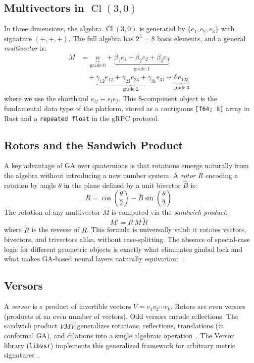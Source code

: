 \documentclass[conference]{IEEEtran}
\begin{document}
\subsection{Multivectors in \texorpdfstring{$\operatorname{Cl}(3,0)$}{Cl(3,0)}}
In three dimensions, the algebra $\operatorname{Cl}(3,0)$ is generated by $\{e_1, e_2, e_3\}$ with signature $(+,+,+)$. The full algebra has $2^3 = 8$ basis elements, and a general \textit{multivector} is:
\begin{equation}
\begin{aligned}
    M &= \underbrace{\alpha}_{\text{grade 0}} + \underbrace{\beta_1 e_1 + \beta_2 e_2 + \beta_3 e_3}_{\text{grade 1}} \\
      &\quad + \underbrace{\gamma_{12} e_{12} + \gamma_{23} e_{23} + \gamma_{31} e_{31}}_{\text{grade 2}} + \underbrace{\delta\, e_{123}}_{\text{grade 3}}
\end{aligned}
    \label{eq:multivector}
\end{equation}
where we use the shorthand $e_{ij} \equiv e_i e_j$. This 8-component object is the fundamental data type of the platform, stored as a contiguous \texttt{[f64; 8]} array in Rust and a \texttt{repeated float} in the gRPC protocol.

\subsection{Rotors and the Sandwich Product}
A key advantage of GA over quaternions is that rotations emerge naturally from the algebra without introducing a new number system. A \textit{rotor} $R$ encoding a rotation by angle $\theta$ in the plane defined by a unit bivector $\hat{B}$ is:
\begin{equation}
    R = \cos\!\left(\frac{\theta}{2}\right) - \hat{B}\sin\!\left(\frac{\theta}{2}\right)
    \label{eq:rotor}
\end{equation}
The rotation of any multivector $M$ is computed via the \textit{sandwich product}:
\begin{equation}
    M' = R\,M\,\tilde{R}
    \label{eq:sandwich}
\end{equation}
where $\tilde{R}$ is the reverse of $R$. This formula is universally valid: it rotates vectors, bivectors, and trivectors alike, without case-splitting. The absence of special-case logic for different geometric objects is exactly what eliminates gimbal lock and what makes GA-based neural layers naturally equivariant~\cite{b_ruhe}.

\subsection{Versors}
A \textit{versor} is a product of invertible vectors $V = v_1 v_2 \cdots v_k$. Rotors are even versors (products of an even number of vectors). Odd versors encode reflections. The sandwich product $V M \tilde{V}$ generalizes rotations, reflections, translations (in conformal GA), and dilations into a single algebraic operation~\cite{b_dorst}. The Versor library (\texttt{libvsr}) implements this generalized framework for arbitrary metric signatures~\cite{b_versor}.
\end{document}
